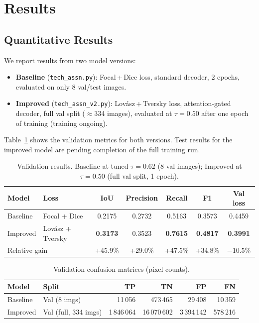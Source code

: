 \documentclass[12pt,a4paper]{article}
\begin{document}
\section{Results}

\subsection{Quantitative Results}

We report results from two model versions:
\begin{itemize}
  \item \textbf{Baseline} (\texttt{tech\_assn.py}): Focal\,+\,Dice loss, standard
    decoder, 2 epochs, evaluated on only 8 val/test images.
  \item \textbf{Improved} (\texttt{tech\_assn\_v2.py}): Lovász\,+\,Tversky loss,
    attention-gated decoder, full val split ($\approx$334 images), evaluated at
    $\tau=0.50$ after one epoch of training (training ongoing).
\end{itemize}

Table~\ref{tab:results} shows the validation metrics for both versions.
Test results for the improved model are pending completion of the full training run.

\begin{table}[H]
\centering
\caption{Validation results.  Baseline at tuned $\tau{=}0.62$ (8 val images);
         Improved at $\tau{=}0.50$ (full val split, 1 epoch).}
\label{tab:results}
\begin{tabular}{llccccc}
\toprule
Model & Loss & IoU & Precision & Recall & F1 & Val loss \\
\midrule
Baseline  & Focal + Dice      & 0.2175 & 0.2732 & 0.5163 & 0.3573 & 0.4459 \\
Improved  & Lovász + Tversky  & \textbf{0.3173} & 0.3523 & \textbf{0.7615} & \textbf{0.4817} & \textbf{0.3991} \\
\midrule
\multicolumn{2}{l}{Relative gain} & {+45.9\%} & {+29.0\%} & {+47.5\%} & {+34.8\%} & {$-$10.5\%} \\
\bottomrule
\end{tabular}
\end{table}

\begin{table}[H]
\centering
\caption{Validation confusion matrices (pixel counts).}
\label{tab:cm}
\begin{tabular}{llrrrr}
\toprule
Model & Split & TP & TN & FP & FN \\
\midrule
Baseline & Val (8 imgs)        & 11\,056        & 473\,465       & 29\,408        & 10\,359 \\
Improved & Val (full, 334 imgs)& 1\,846\,064    & 16\,070\,602   & 3\,394\,142    & 578\,216 \\
\bottomrule
\end{tabular}
\end{table}
\end{document}
